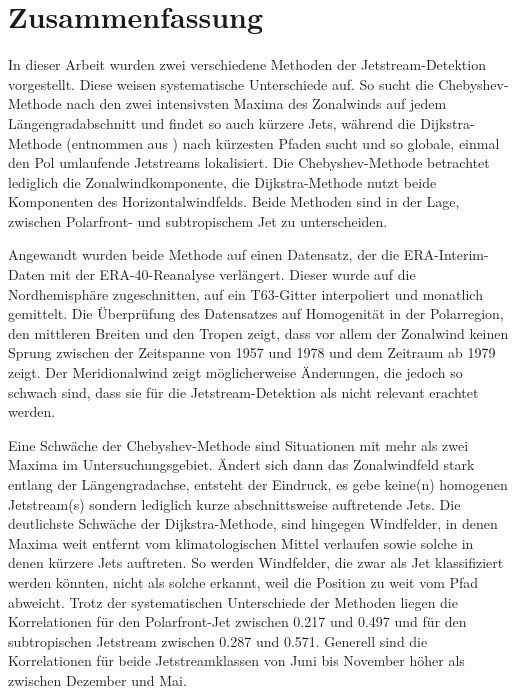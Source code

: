 \chapter{Zusammenfassung} \label{ch:diskussion}

In dieser Arbeit wurden zwei verschiedene Methoden der Jetstream-Detektion vorgestellt. Diese weisen systematische Unterschiede auf. So sucht die Chebyshev-Methode nach den zwei intensivsten Maxima des Zonalwinds auf jedem Längengradabschnitt und findet so auch kürzere Jets, während die Dijkstra-Methode (entnommen aus \citep{molnos-2017}) nach kürzesten Pfaden sucht und so globale, einmal den Pol umlaufende Jetstreams lokalisiert. Die Chebyshev-Methode betrachtet lediglich die Zonalwindkomponente, die Dijkstra-Methode nutzt beide Komponenten des Horizontalwindfelds. Beide Methoden sind in der Lage, zwischen Polarfront- und subtropischem Jet zu unterscheiden.

Angewandt wurden beide Methode auf einen Datensatz, der die ERA-Interim-Daten mit der ERA-40-Reanalyse verlängert. Dieser wurde auf die Nordhemisphäre zugeschnitten, auf ein T63-Gitter interpoliert und monatlich gemittelt. Die Überprüfung des Datensatzes auf Homogenität in der Polarregion, den mittleren Breiten und den Tropen zeigt, dass vor allem der Zonalwind keinen Sprung zwischen der Zeitspanne von \num{1957} und \num{1978} und dem Zeitraum ab \num{1979} zeigt. Der Meridionalwind zeigt möglicherweise Änderungen, die jedoch so schwach sind, dass sie für die Jetstream-Detektion als nicht relevant erachtet werden.

Eine Schwäche der Chebyshev-Methode sind Situationen mit mehr als zwei Maxima im Untersuchungsgebiet. Ändert sich dann das Zonalwindfeld stark entlang der Längengradachse, entsteht der Eindruck, es gebe keine(n) homogenen Jetstream(s) sondern lediglich kurze abschnittsweise auftretende Jets. Die deutlichste Schwäche der Dijkstra-Methode, sind hingegen Windfelder, in denen Maxima weit entfernt vom klimatologischen Mittel verlaufen sowie solche in denen kürzere Jets auftreten. So werden Windfelder, die zwar als Jet klassifiziert werden könnten, nicht als solche erkannt, weil die Position zu weit vom Pfad abweicht. Trotz der systematischen Unterschiede der Methoden liegen die Korrelationen für den Polarfront-Jet zwischen \num{0.217} und \num{0.497} und für den subtropischen Jetstream zwischen \num{0.287} und \num{0.571}. Generell sind die Korrelationen für beide Jetstreamklassen von Juni bis November höher als zwischen Dezember und Mai.

